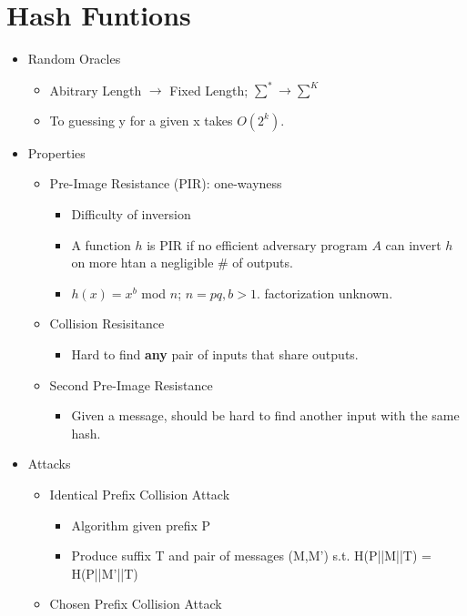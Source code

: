 \section{Hash Funtions}
\begin{itemize}
\item Random Oracles
    \begin{itemize}
    \item Abitrary Length $\rightarrow$ Fixed Length; $\sum^* \rightarrow \sum^K$
    \item To guessing y for a given x takes $O(2^k)$.
    \end{itemize}
\item Properties
    \begin{itemize}
    \item Pre-Image Resistance (PIR): one-wayness
        \begin{itemize}
        \item Difficulty of inversion
        \item A function $h$ is PIR if no efficient adversary program $A$ can invert $h$ on more htan a negligible # of outputs.
        \item $h(x) = x^b$ mod $n$; $n=pq, b>1$. factorization unknown.
        \end{itemize}
    \item Collision Resisitance
        \begin{itemize}
        \item Hard to find \textbf{any} pair of inputs that share outputs.
        \end{itemize}
    \item Second Pre-Image Resistance
        \begin{itemize}
        \item Given a message, should be hard to find another input with the same hash.
        \end{itemize}
    \end{itemize}
\item Attacks
    \begin{itemize}
    \item Identical Prefix Collision Attack
        \begin{itemize}
        \item Algorithm given prefix P
        \item Produce suffix T and pair of messages (M,M') s.t. H(P||M||T) = H(P||M'||T)
        \end{itemize}
    \item Chosen Prefix Collision Attack

\end{itemize}
\end{itemize}
